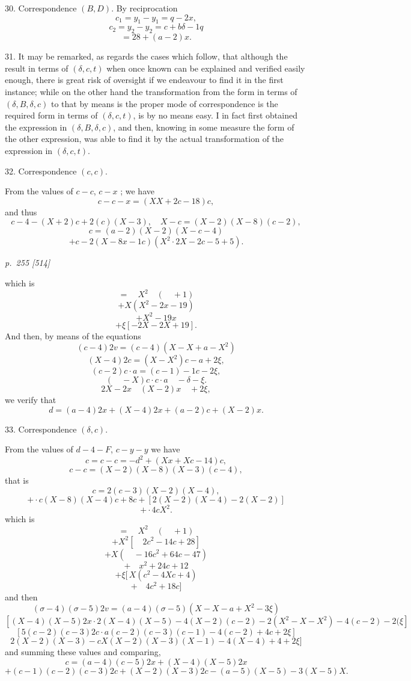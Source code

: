\documentclass[11pt,a4paper]{book}
\begin{document}
30.  Correspondence $(B, D)$.  By reciprocation
\[
c_1 = y_1 - y_1 = q - 2x,
\]
\[
c_2 = y_2 - y_2 = c + b\delta - 1q
\]
\[
= 28 + (a - 2)x.
\]

31.  It may be remarked, as regards the cases which follow, that although the
result in terms of $(\delta, c, t)$ when once known can be explained and verified easily
enough, there is great risk of oversight if we endeavour to find it in the first
instance; while on the other hand the transformation from the form in terms of
$(\delta, B, \delta, c)$ to that by means is the proper mode of correspondence is the required form in
terms of $(\delta, c, t)$, is by no means easy.  I in fact first obtained the expression in $(\delta, B, \delta, c)$,
and then, knowing in some measure the form of the other expression, was able to
find it by the actual transformation of the expression in $(\delta, c, t)$.

32.  Correspondence $(c, c)$.

From the values of $c - c$, $c - x$ ; we have
\[
c - c - x = (XX + 2c - 18)c,
\]
and thus
\[
c - 4 - (X + 2)c + 2(c)(X - 3), \quad X - c = (X - 2)(X - 8)(c - 2),
\]
\[
c = (a - 2)(X - 2)(X - c - 4)
\]
\[
+ c - 2(X - 8x - 1c)(X^2 \cdot 2X - 2c - 5 + 5).
\]

\clearpage

\bigskip
\textit{p.~255 [514]}
\smallskip

\noindent
which is
\[
= \quad X^2 \quad ( \quad + 1)
\]
\[
+ X (X^2 - 2x - 19)
\]
\[
+ X^2 - 19x
\]
\[
+ \xi [-2X - 2X + 19].
\]
And then, by means of the equations
\[
(c - 4) 2v = (c - 4)(X - X + a - X^2)
\]
\[
(X - 4)2c = (X - X^2)c - a + 2\xi,
\]
\[
(c - 2)c \cdot a = (c - 1) - 1c - 2\xi,
\]
\[
(\quad - X)c \cdot c \cdot a \quad - \delta - \xi.
\]
\[
2X - 2x \quad (X - 2)x \quad + 2\xi,
\]
we verify that
\[
d = (a - 4)2x + (X - 4)2x + (a - 2)c + (X - 2)x.
\]

33.  Correspondence $(\delta, c)$.

From the values of $d - 4 - F$, $c - y - y$ we have
\[
c = c - c = -d^2 + (Xx + Xc - 14)c,
\]
\[
c - c = (X - 2)(X - 8)(X - 3)(c - 4),
\]
that is
\[
c = 2(c - 3)(X - 2)(X - 4),
\]
\[
+ \cdot c (X - 8)(X - 4)c + 8c + [2(X - 2)(X - 4) - 2(X - 2)]
\]
\[
+ \cdot 4c X^2.
\]
which is
\[
= \quad X^2 \quad ( \quad + 1)
\]
\[
+ X^2 [\quad 2c^2 - 14c + 28]
\]
\[
+ X (\quad - 16c^2 + 64c - 47)
\]
\[
+ \quad x^2 + 24c + 12
\]
\[
+ \xi [\,X(c^2 - 4Xc + 4)
\]
\[
+ \quad 4c^2 + 18c]
\]
and then
\[
(\sigma - 4)(\sigma - 5) 2v = (a - 4)(\sigma - 5)(X - X - a + X^2 - 3\xi)
\]
\[
[(X - 4)(X - 5) 2x \cdot 2(X - 4)(X - 5) - 4(X - 2)(c - 2) - 2(X^2 - X - X^2) - 4(c - 2) - 2(\xi]
\]
\[
[5(c - 2)(c - 3) 2c \cdot a (c - 2)(c - 3)(c - 1) - 4(c - 2) + 4c + 2\xi]
\]
\[
2(X - 2)(X - 3) - cX(X - 2)(X - 3)(X - 1) - 4(X - 4) + 4 + 2\xi]
\]
and summing these values and comparing,
\[
c = (a - 4)(c - 5) 2x + (X - 4)(X - 5) 2x
\]
\[
+ (c - 1)(c - 2)(c - 3) 2c + (X - 2)(X - 3) 2c - (a - 5)(X - 5) - 3(X - 5)X.
\]
\end{document}
